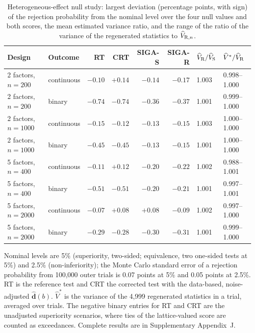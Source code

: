 \begin{table}[!htbp]
\centering
\caption{Heterogeneous-effect null study: largest deviation (percentage points, with sign) of the rejection probability from the nominal level over the four null values and both scores, the mean estimated variance ratio, and the range of the ratio of the variance of the regenerated statistics to $\widehat V_{{\rm R},n}$.}
\label{tab:hetero-null}
\begin{threeparttable}\begin{singlespace}\small\setlength{\tabcolsep}{4pt}
\begin{tabular}{@{}llrrrrll@{}}
\toprule
Design & Outcome & RT & CRT & SIGA-S & SIGA-R & $\widehat V_{\rm R}/\widehat V_{\rm S}$ & $\widehat V^{*}/\widehat V_{\rm R}$\\
\midrule
2 factors, $n=200$ & continuous & $-0.10$ & $+0.14$ & $-0.14$ & $-0.17$ & 1.003 & 0.998--1.000\\
2 factors, $n=200$ & binary & $-0.74$ & $-0.74$ & $-0.36$ & $-0.37$ & 1.001 & 0.999--1.000\\
2 factors, $n=1000$ & continuous & $-0.15$ & $-0.12$ & $-0.13$ & $-0.15$ & 1.003 & 1.000--1.000\\
2 factors, $n=1000$ & binary & $-0.45$ & $-0.45$ & $-0.13$ & $-0.15$ & 1.001 & 1.000--1.000\\
5 factors, $n=400$ & continuous & $-0.11$ & $+0.12$ & $-0.20$ & $-0.22$ & 1.002 & 0.988--1.001\\
5 factors, $n=400$ & binary & $-0.51$ & $-0.51$ & $-0.20$ & $-0.21$ & 1.001 & 0.997--1.001\\
5 factors, $n=2000$ & continuous & $-0.07$ & $+0.08$ & $+0.08$ & $-0.09$ & 1.002 & 0.997--1.000\\
5 factors, $n=2000$ & binary & $-0.29$ & $-0.28$ & $-0.30$ & $-0.31$ & 1.001 & 0.999--1.000\\
\bottomrule
\end{tabular}
\begin{tablenotes}[flushleft]\small
\item Nominal levels are 5\% (superiority, two-sided; equivalence, two one-sided tests at 5\%) and 2.5\% (non-inferiority); the Monte Carlo standard error of a rejection probability from 100,000 outer trials is 0.07 points at 5\% and 0.05 points at 2.5\%. RT is the reference test and CRT the corrected test with the data-based, noise-adjusted $\widehat{\bm d}(b)$. $\widehat V^{*}$ is the variance of the 4,999 regenerated statistics in a trial, averaged over trials. The negative binary entries for RT and CRT are the unadjusted superiority scenarios, where ties of the lattice-valued score are counted as exceedances. Complete results are in Supplementary Appendix~J.
\end{tablenotes}\end{singlespace}\end{threeparttable}
\end{table}
